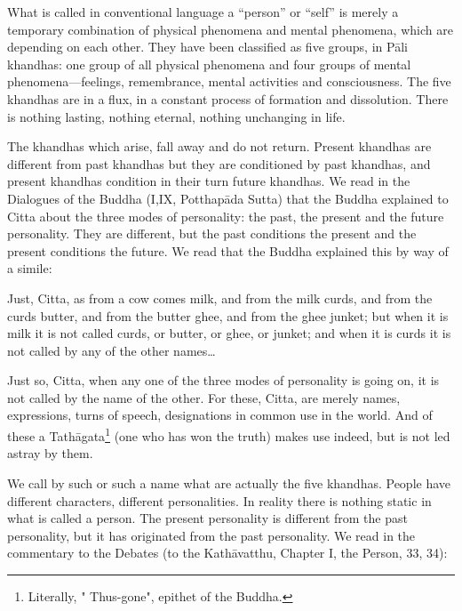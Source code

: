 \documentclass{book}
\begin{document}
What is called in conventional language a ``person'' or ``self'' is
merely a temporary combination of physical phenomena and mental
phenomena, which are depending on each other. They have been classified
as five groups, in Pāli khandhas: one group of all physical phenomena
and four groups of mental phenomena---feelings, remembrance, mental
activities and consciousness. The five khandhas are in a flux, in a
constant process of formation and dissolution. There is nothing lasting,
nothing eternal, nothing unchanging in life.

The khandhas which arise, fall away and do not return. Present khandhas
are different from past khandhas but they are conditioned by past
khandhas, and present khandhas condition in their turn future khandhas.
We read in the Dialogues of the Buddha (I,IX, Potthapāda Sutta)
that the Buddha explained to Citta about the three modes of personality:
the past, the present and the future personality. They are different,
but the past conditions the present and the present conditions the
future. We read that the Buddha explained this by way of a simile:

Just, Citta, as from a cow comes milk, and from the milk curds, and from
the curds butter, and from the butter ghee, and from the ghee junket;
but when it is milk it is not called curds, or butter, or ghee, or
junket; and when it is curds it is not called by any of the other
names\ldots{}

Just so, Citta, when any one of the three modes of personality is going
on, it is not called by the name of the other. For these, Citta, are
merely names, expressions, turns of speech, designations in common use
in the world. And of these a Tathāgata\footnote{Literally, " Thus-gone",
  epithet of the Buddha.} (one who has won the truth) makes use indeed,
but is not led astray by them.

We call by such or such a name what are actually the five khandhas.
People have different characters, different per­son­ali­ties. In reality
there is nothing static in what is called a person. The present
personality is different from the past personality, but it has
originated from the past personality. We read in the commentary to the
Debates (to the Kathāvatthu, Chapter I, the Person, 33, 34):
\end{document}
